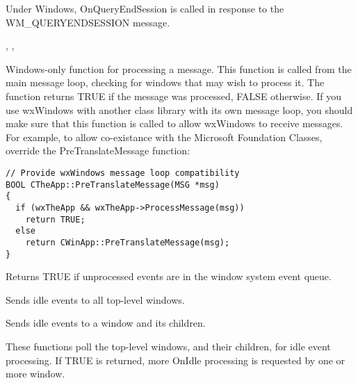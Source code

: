 Under Windows, OnQueryEndSession is called in response to the WM\_QUERYENDSESSION message.


,\rtfsp
{},\rtfsp
{}

\label{wxappprocessmessage}


Windows-only function for processing a message. This function
is called from the main message loop, checking for windows that
may wish to process it. The function returns TRUE if the message
was processed, FALSE otherwise. If you use wxWindows with another class
library with its own message loop, you should make sure that this
function is called to allow wxWindows to receive messages. For example,
to allow co-existance with the Microsoft Foundation Classes, override
the PreTranslateMessage function:

\begin{verbatim}
// Provide wxWindows message loop compatibility
BOOL CTheApp::PreTranslateMessage(MSG *msg)
{
  if (wxTheApp && wxTheApp->ProcessMessage(msg))
    return TRUE;
  else
    return CWinApp::PreTranslateMessage(msg);
}
\end{verbatim}

\label{wxapppending}


Returns TRUE if unprocessed events are in the window system event queue.



\label{wxappsendidleevents}


Sends idle events to all top-level windows.


Sends idle events to a window and its children.


These functions poll the top-level windows, and their children, for idle event processing.
If TRUE is returned, more OnIdle processing is requested by one or more window.

